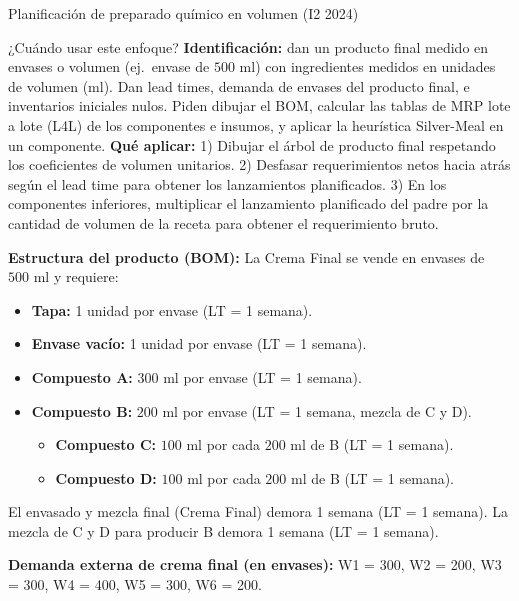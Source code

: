 \begin{ejercicio}{Planificación de preparado químico en volumen (I2 2024)}

\begin{tipprueba}{¿Cuándo usar este enfoque?}
\textbf{Identificación:} dan un producto final medido en envases o volumen (ej.\ envase de $500\text{ ml}$) con ingredientes medidos en unidades de volumen (ml). Dan lead times, demanda de envases del producto final, e inventarios iniciales nulos. Piden dibujar el BOM, calcular las tablas de MRP lote a lote (L4L) de los componentes e insumos, y aplicar la heurística Silver-Meal en un componente.
\textbf{Qué aplicar:}
1) Dibujar el árbol de producto final respetando los coeficientes de volumen unitarios.
2) Desfasar requerimientos netos hacia atrás según el lead time para obtener los lanzamientos planificados.
3) En los componentes inferiores, multiplicar el lanzamiento planificado del padre por la cantidad de volumen de la receta para obtener el requerimiento bruto.
\end{tipprueba}

\textbf{Estructura del producto (BOM):}
La Crema Final se vende en envases de $500\text{ ml}$ y requiere:
\begin{itemize}[leftmargin=1.4em, itemsep=1pt]
  \item \textbf{Tapa:} 1 unidad por envase (LT = 1 semana).
  \item \textbf{Envase vacío:} 1 unidad por envase (LT = 1 semana).
  \item \textbf{Compuesto A:} $300\text{ ml}$ por envase (LT = 1 semana).
  \item \textbf{Compuesto B:} $200\text{ ml}$ por envase (LT = 1 semana, mezcla de C y D).
    \begin{itemize}[leftmargin=1.2em, itemsep=0pt]
      \item \textbf{Compuesto C:} $100\text{ ml}$ por cada $200\text{ ml}$ de B (LT = 1 semana).
      \item \textbf{Compuesto D:} $100\text{ ml}$ por cada $200\text{ ml}$ de B (LT = 1 semana).
    \end{itemize}
\end{itemize}
El envasado y mezcla final (Crema Final) demora 1 semana (LT = 1 semana). La mezcla de C y D para producir B demora 1 semana (LT = 1 semana).

\textbf{Demanda externa de crema final (en envases):}
W1 = 300, W2 = 200, W3 = 300, W4 = 400, W5 = 300, W6 = 200.


\end{ejercicio}
